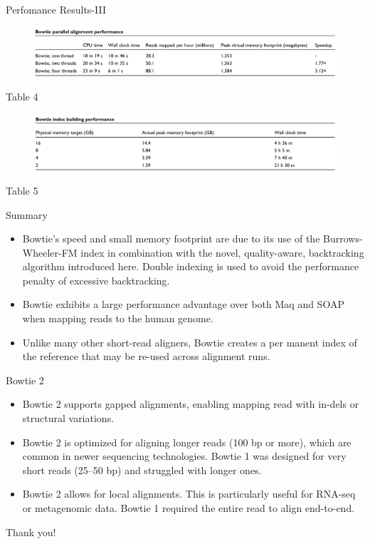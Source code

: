 \documentclass[mathserif]{beamer}
\begin{document}
\begin{frame}{Perfomance Results-III}
    \begin{figure}
        \includegraphics[width=\textwidth]{media/tab4.png}
    \end{figure}\centering \tiny Table 4
    \pause
    \begin{figure}
        \includegraphics[width=\textwidth]{media/tab5.png}
    \end{figure} \centering \tiny Table 5
\end{frame}

\begin{frame}{Summary}
    \begin{itemize}
        \item Bowtie's speed and small memory footprint are due to
        its use of the Burrows-Wheeler-FM index in combination with the
        novel, quality-aware, backtracking algorithm introduced
        here. Double indexing is used to avoid the performance penalty
        of excessive backtracking.
        \item Bowtie exhibits a large performance advantage over both Maq
        and SOAP when mapping reads to the human genome.
        \item  Unlike many other short-read aligners, Bowtie creates a per
        manent index of the reference that may be re-used across
        alignment runs. 
    \end{itemize}
\end{frame}

\begin{frame}{Bowtie 2}
    \begin{itemize}
        \item Bowtie 2 supports gapped alignments, enabling 
        mapping read with in-dels or structural variations.
        \item Bowtie 2 is optimized for aligning longer reads 
        (100 bp or more), which are common in newer sequencing 
        technologies. Bowtie 1 was designed for very short reads 
        (25–50 bp) and struggled with longer ones.
        \item Bowtie 2 allows for local alignments. This 
        is particularly useful for RNA-seq or metagenomic data. 
        Bowtie 1 required the entire read to align end-to-end.
    \end{itemize}
\end{frame}

\begin{frame}{}
 \begin{center}
    \Huge Thank you!
 \end{center}
\end{frame}
\end{document}
